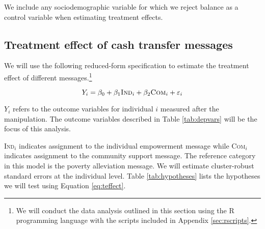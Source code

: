 \documentclass[11pt, a4paper]{article}\usepackage[]{graphicx}\usepackage[]{color}
\begin{document}
        We include any sociodemographic variable for which we reject balance as a control variable when estimating treatment effects.

    \subsection{Treatment effect of cash transfer messages}

        We will use the following reduced-form specification to estimate the treatment effect of different messages.\footnote{We will conduct the data analysis outlined in this section using the R programming language with the scripts included in Appendix \ref{sec:rscripts}.}

  		\begin{equation} \label{eq:teffect}
            Y_{i} = \beta_{0} + \beta_{1}\text{\textsc{Ind}}_{i} + \beta_{2}\text{\textsc{Com}}_{i} + \varepsilon_{i}
		\end{equation}

        $Y_{i}$ refers to the outcome variables for individual $i$ measured after the manipulation. The outcome variables described in Table \ref{tab:depvars} will be the focus of this analysis.

        \begin{table}[h]
        \centering
        \caption{Primary outcome variables}
        \label{tab:depvars}
        \end{table}

        \textsc{Ind}$_{i}$ indicates assignment to the individual empowerment message while \textsc{Com}$_{i}$ indicates assignment to the community support message. The reference category in this model is the poverty alleviation message. We will estimate cluster-robust standard errors at the individual level. Table \ref{tab:hypotheses} lists the hypotheses we will test using Equation \ref{eq:teffect}.
\end{document}
